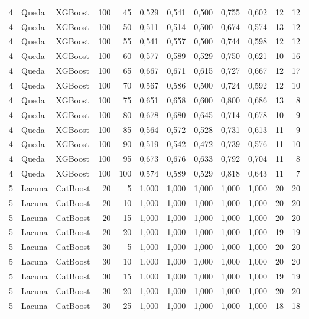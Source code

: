 \begin{longtable}{@{}rllrrrrrrrrr@{}}
4 & Queda & XGBoost & 100 & 45 & 0,529 & 0,541 & 0,500 & 0,755 & 0,602 & 12 & 12 \\
4 & Queda & XGBoost & 100 & 50 & 0,511 & 0,514 & 0,500 & 0,674 & 0,574 & 13 & 12 \\
4 & Queda & XGBoost & 100 & 55 & 0,541 & 0,557 & 0,500 & 0,744 & 0,598 & 12 & 12 \\
4 & Queda & XGBoost & 100 & 60 & 0,577 & 0,589 & 0,529 & 0,750 & 0,621 & 10 & 16 \\
4 & Queda & XGBoost & 100 & 65 & 0,667 & 0,671 & 0,615 & 0,727 & 0,667 & 12 & 17 \\
4 & Queda & XGBoost & 100 & 70 & 0,567 & 0,586 & 0,500 & 0,724 & 0,592 & 12 & 10 \\
4 & Queda & XGBoost & 100 & 75 & 0,651 & 0,658 & 0,600 & 0,800 & 0,686 & 13 & 8 \\
4 & Queda & XGBoost & 100 & 80 & 0,678 & 0,680 & 0,645 & 0,714 & 0,678 & 10 & 9 \\
4 & Queda & XGBoost & 100 & 85 & 0,564 & 0,572 & 0,528 & 0,731 & 0,613 & 11 & 9 \\
4 & Queda & XGBoost & 100 & 90 & 0,519 & 0,542 & 0,472 & 0,739 & 0,576 & 11 & 10 \\
4 & Queda & XGBoost & 100 & 95 & 0,673 & 0,676 & 0,633 & 0,792 & 0,704 & 11 & 8 \\
4 & Queda & XGBoost & 100 & 100 & 0,574 & 0,589 & 0,529 & 0,818 & 0,643 & 11 & 7 \\
5 & Lacuna & CatBoost & 20 & 5 & 1,000 & 1,000 & 1,000 & 1,000 & 1,000 & 20 & 20 \\
5 & Lacuna & CatBoost & 20 & 10 & 1,000 & 1,000 & 1,000 & 1,000 & 1,000 & 20 & 20 \\
5 & Lacuna & CatBoost & 20 & 15 & 1,000 & 1,000 & 1,000 & 1,000 & 1,000 & 20 & 20 \\
5 & Lacuna & CatBoost & 20 & 20 & 1,000 & 1,000 & 1,000 & 1,000 & 1,000 & 19 & 19 \\
5 & Lacuna & CatBoost & 30 & 5 & 1,000 & 1,000 & 1,000 & 1,000 & 1,000 & 20 & 20 \\
5 & Lacuna & CatBoost & 30 & 10 & 1,000 & 1,000 & 1,000 & 1,000 & 1,000 & 20 & 20 \\
5 & Lacuna & CatBoost & 30 & 15 & 1,000 & 1,000 & 1,000 & 1,000 & 1,000 & 19 & 19 \\
5 & Lacuna & CatBoost & 30 & 20 & 1,000 & 1,000 & 1,000 & 1,000 & 1,000 & 20 & 20 \\
5 & Lacuna & CatBoost & 30 & 25 & 1,000 & 1,000 & 1,000 & 1,000 & 1,000 & 18 & 18 \\

\end{longtable}
